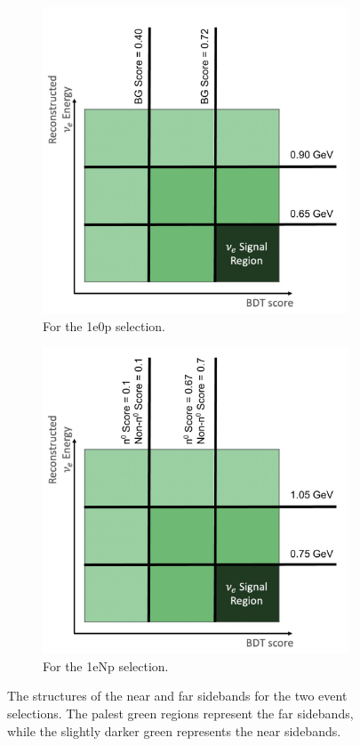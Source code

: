 \begin{figure}[H]
    \centering
    \begin{subfigure}{0.5\linewidth}
        \includegraphics[width=\linewidth]{technote/Sidebands/Figures/ZpNearAndFarSidebands.pdf}
        \caption{For the 1e0p selection.}
    \end{subfigure}%
    \begin{subfigure}{0.5\linewidth}
        \includegraphics[width=\linewidth]{technote/Sidebands/Figures/NpNearAndFarSidebands.pdf}
        \caption{For the 1eNp selection.}
    \end{subfigure}
    \caption{The structures of the near and far sidebands for the two event selections. The palest green regions represent the far sidebands, while the slightly darker green represents the near sidebands.}
    \label{fig:SidebandStructure}
\end{figure}


